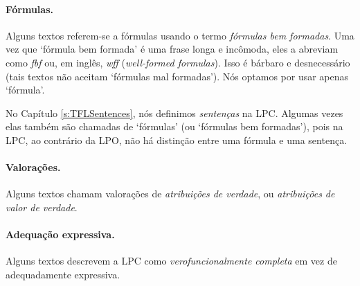 
\paragraph{Fórmulas.} Alguns textos referem-se a fórmulas usando o termo \emph{fórmulas bem formadas}. Uma vez que `fórmula bem formada' é uma frase longa e incômoda, eles a abreviam como \emph{fbf} ou, em inglês, \emph{wff} (\emph{well-formed formulas}). Isso é bárbaro e desnecessário (tais textos não aceitam `fórmulas mal formadas'). Nós optamos por usar apenas `fórmula'.


No Capítulo \ref{s:TFLSentences}, nós definimos \emph{sentenças} na LPC. Algumas vezes elas também são chamadas de `fórmulas' (ou `fórmulas bem formadas'), pois na LPC, ao contrário da LPO, não há distinção entre uma fórmula e uma sentença. 

\paragraph{Valorações.} Alguns textos chamam valorações de \emph{atribuições de verdade}, ou \emph{atribuições de valor de verdade}.

\paragraph{Adequação expressiva.} Alguns textos descrevem a LPC como \emph{verofuncionalmente completa} em vez de adequadamente expressiva.

